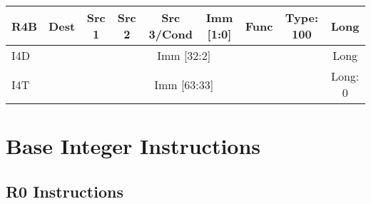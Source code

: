 \documentclass{article}
\begin{document}
\begin{table}[H]
\begin{tabular}{|l|l|r|l|r|l|r|l|r|l|r|l|r|l|r|c|}
    \hline R4B  &   \multicolumn{2}{|c|}{Dest}  &   \multicolumn{2}{|c|}{Src 1}     &   \multicolumn{2}{|c|}{Src 2}         &   \multicolumn{2}{|c|}{Src 3/Cond}    &   \multicolumn{2}{|c|}{Imm [1:0]} &   \multicolumn{2}{|c|}{Func}      &   \multicolumn{2}{|c|}{Type: 100} &   Long \\

    \hline I4D  &   \multicolumn{14}{|c|}{Imm [32:2]}   &   Long \\
    
    \hline I4T  &   \multicolumn{14}{|c|}{Imm [63:33]}  &   Long: 0 \\
    
    
    \hline
    \end{tabular}
    \end{table}
    
    \newpage

\section{Base Integer Instructions}

    \subsection{R0 Instructions}
    
\end{document}
